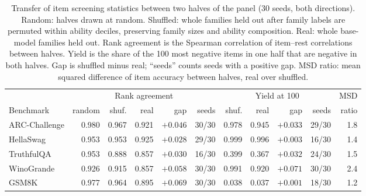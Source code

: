 \begin{table}[!htb]\centering\footnotesize\setlength{\tabcolsep}{3.5pt}
\caption{Transfer of item screening statistics between two halves of the panel (30 seeds, both directions). Random: halves drawn at random. Shuffled: whole families held out after family labels are permuted within ability deciles, preserving family sizes and ability composition. Real: whole base-model families held out. Rank agreement is the Spearman correlation of item--rest correlations between halves. Yield is the share of the 100 most negative items in one half that are negative in both halves. Gap is shuffled minus real; ``seeds'' counts seeds with a positive gap. MSD ratio: mean squared difference of item accuracy between halves, real over shuffled.}\label{tab:transfer}
\begin{tabular}{l|rrrrr|rrrr|r}
\toprule
 & \multicolumn{5}{c|}{Rank agreement} & \multicolumn{4}{c|}{Yield at 100} & MSD\\
Benchmark & random & shuf. & real & gap & seeds & shuf. & real & gap & seeds & ratio\\
\midrule
ARC-Challenge & 0.980 & 0.967 & 0.921 & $+0.046$ & 30/30 & 0.978 & 0.945 & $+0.033$ & 29/30 & 1.8\\
HellaSwag & 0.953 & 0.953 & 0.925 & $+0.028$ & 29/30 & 0.999 & 0.996 & $+0.003$ & 16/30 & 1.4\\
TruthfulQA & 0.953 & 0.888 & 0.857 & $+0.030$ & 16/30 & 0.399 & 0.367 & $+0.032$ & 24/30 & 1.5\\
WinoGrande & 0.926 & 0.915 & 0.857 & $+0.058$ & 30/30 & 0.991 & 0.920 & $+0.071$ & 30/30 & 2.4\\
GSM8K & 0.977 & 0.964 & 0.895 & $+0.069$ & 30/30 & 0.038 & 0.037 & $+0.001$ & 18/30 & 1.2\\
\bottomrule
\end{tabular}
\end{table}
